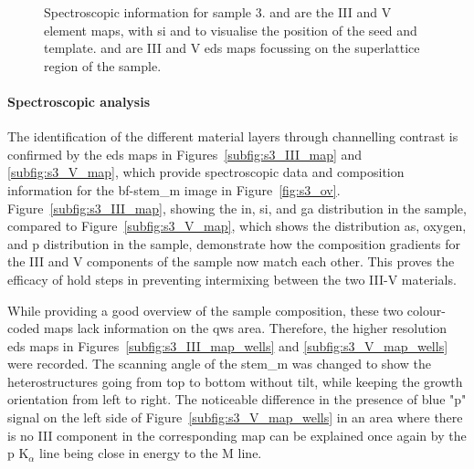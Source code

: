 \begin{figure}
{\begin{tikzpicture}
    \end{tikzpicture}
    }
    \caption{Spectroscopic information for sample 3.  and  are the III and V element maps, with \acs{si} and  to visualise the position of the seed and template.  and  are III and V \acs{eds} maps focussing on the superlattice region of the sample.}
    \label{fig:s3_maps}
\end{figure}

\paragraph{Spectroscopic analysis} The identification of the different material layers through channelling contrast is confirmed by the \acs{eds} maps in Figures~\ref{subfig:s3_III_map} and \ref{subfig:s3_V_map}, which provide spectroscopic data and composition information for the \acs{bf}-\acs{stem_m} image in Figure~\ref{fig:s3_ov}. Figure~\ref{subfig:s3_III_map}, showing the \acl{in}, \acl{si}, and \acl{ga} distribution in the sample, compared to Figure~\ref{subfig:s3_V_map}, which shows the distribution \acl{as}, oxygen, and \acl{p} distribution in the sample, demonstrate how the composition gradients for the III and V components of the sample now match each other. This proves the efficacy of hold steps in preventing intermixing between the two III-V materials.

While providing a good overview of the sample composition, these two colour-coded maps lack information on the \acl{qw}s area. Therefore, the higher resolution \acs{eds} maps in Figures~\ref{subfig:s3_III_map_wells} and \ref{subfig:s3_V_map_wells} were recorded. The scanning angle of the \acs{stem_m} was changed to show the heterostructures going from top to bottom without tilt, while keeping the growth orientation from left to right. The noticeable difference in the presence of blue "\acl{p}" signal on the left side of Figure~\ref{subfig:s3_V_map_wells} in an area where there is no III component in the corresponding map can be explained once again by the \acl{p} K\(_\alpha\) line being close in energy to the  M line. 

